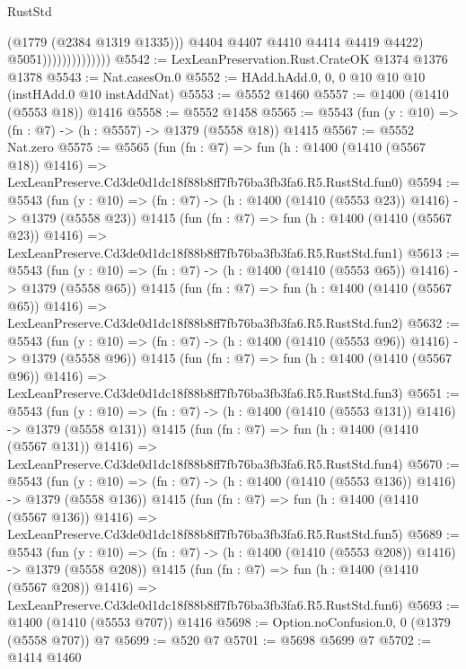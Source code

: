 \begin{lexlean}{RustStd}
\begin{coremodule}
                                    (@1779 (@2384 @1319 @1335)))
                                  @4404
                                  @4407
                                  @4410
                                  @4414
                                  @4419
                                  @4422)
                                @5051))))))))))))))
@5542 := LexLeanPreservation.Rust.CrateOK @1374 @1376 @1378
@5543 := Nat.casesOn.{0}
@5552 := HAdd.hAdd.{0, 0, 0} @10 @10 @10 (instHAdd.{0} @10 instAddNat)
@5553 := @5552 @1460
@5557 := @1400 (@1410 (@5553 @18)) @1416
@5558 := @5552 @1458
@5565 := @5543 (fun (y : @10) => (fn : @7) -> (h : @5557) -> @1379 (@5558 @18)) @1415
@5567 := @5552 Nat.zero
@5575 := @5565
    (fun (fn : @7) =>
    fun (h : @1400 (@1410 (@5567 @18)) @1416) =>
    LexLeanPreserve.Cd3de0d1dc18f88b8ff7fb76ba3fb3fa6.R5.RustStd.fun0)
@5594 := @5543
    (fun (y : @10) => (fn : @7) -> (h : @1400 (@1410 (@5553 @23)) @1416) -> @1379 (@5558 @23))
    @1415
    (fun (fn : @7) =>
    fun (h : @1400 (@1410 (@5567 @23)) @1416) =>
    LexLeanPreserve.Cd3de0d1dc18f88b8ff7fb76ba3fb3fa6.R5.RustStd.fun1)
@5613 := @5543
    (fun (y : @10) => (fn : @7) -> (h : @1400 (@1410 (@5553 @65)) @1416) -> @1379 (@5558 @65))
    @1415
    (fun (fn : @7) =>
    fun (h : @1400 (@1410 (@5567 @65)) @1416) =>
    LexLeanPreserve.Cd3de0d1dc18f88b8ff7fb76ba3fb3fa6.R5.RustStd.fun2)
@5632 := @5543
    (fun (y : @10) => (fn : @7) -> (h : @1400 (@1410 (@5553 @96)) @1416) -> @1379 (@5558 @96))
    @1415
    (fun (fn : @7) =>
    fun (h : @1400 (@1410 (@5567 @96)) @1416) =>
    LexLeanPreserve.Cd3de0d1dc18f88b8ff7fb76ba3fb3fa6.R5.RustStd.fun3)
@5651 := @5543
    (fun (y : @10) => (fn : @7) -> (h : @1400 (@1410 (@5553 @131)) @1416) -> @1379 (@5558 @131))
    @1415
    (fun (fn : @7) =>
    fun (h : @1400 (@1410 (@5567 @131)) @1416) =>
    LexLeanPreserve.Cd3de0d1dc18f88b8ff7fb76ba3fb3fa6.R5.RustStd.fun4)
@5670 := @5543
    (fun (y : @10) => (fn : @7) -> (h : @1400 (@1410 (@5553 @136)) @1416) -> @1379 (@5558 @136))
    @1415
    (fun (fn : @7) =>
    fun (h : @1400 (@1410 (@5567 @136)) @1416) =>
    LexLeanPreserve.Cd3de0d1dc18f88b8ff7fb76ba3fb3fa6.R5.RustStd.fun5)
@5689 := @5543
    (fun (y : @10) => (fn : @7) -> (h : @1400 (@1410 (@5553 @208)) @1416) -> @1379 (@5558 @208))
    @1415
    (fun (fn : @7) =>
    fun (h : @1400 (@1410 (@5567 @208)) @1416) =>
    LexLeanPreserve.Cd3de0d1dc18f88b8ff7fb76ba3fb3fa6.R5.RustStd.fun6)
@5693 := @1400 (@1410 (@5553 @707)) @1416
@5698 := Option.noConfusion.{0, 0} (@1379 (@5558 @707)) @7
@5699 := @520 @7
@5701 := @5698 @5699 @7
@5702 := @1414 @1460

\end{coremodule}
\end{lexlean}
